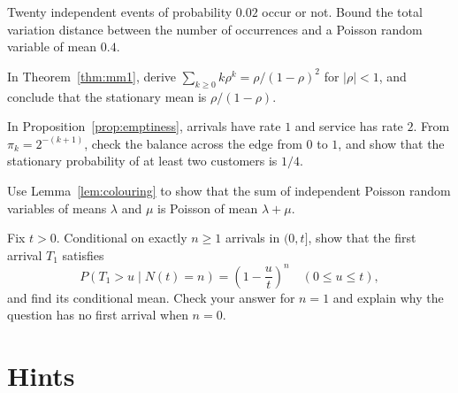 \begin{exercise}[$\star\star$]\label{ex:lecamnum}
Twenty independent events of probability $0.02$ occur or not. Bound the total variation distance between the number of occurrences and a Poisson random variable of mean $0.4$.
\end{exercise}

\begin{exercise}[$\star\star$]\label{ex:mm1mean}
In Theorem~\ref{thm:mm1}, derive $\sum_{k\ge0}k\rho^k=\rho/(1-\rho)^2$ for $|\rho|<1$, and conclude that the stationary mean is $\rho/(1-\rho)$.
\end{exercise}

\begin{exercise}[$\star\star$]\label{ex:emptycheck}
In Proposition~\ref{prop:emptiness}, arrivals have rate $1$ and service has rate $2$. From $\pi_k=2^{-(k+1)}$, check the balance across the edge from $0$ to $1$, and show that the stationary probability of at least two customers is $1/4$.
\end{exercise}

\begin{exercise}[$\star$]\label{ex:superpose}
Use Lemma~\ref{lem:colouring} to show that the sum of independent Poisson random variables of means $\lambda$ and $\mu$ is Poisson of mean $\lambda+\mu$.
\end{exercise}

\begin{exercise}[$\star\star$]\label{ex:firstarrival}
Fix $t>0$. Conditional on exactly $n\ge1$ arrivals in $(0,t]$, show that the first arrival $T_1$ satisfies
\[
 P(T_1>u\mid N(t)=n)=\left(1-\frac ut\right)^n
 \quad(0\le u\le t),
\]
and find its conditional mean. Check your answer for $n=1$ and explain why the question has no first arrival when $n=0$.
\end{exercise}

\section{Hints}

